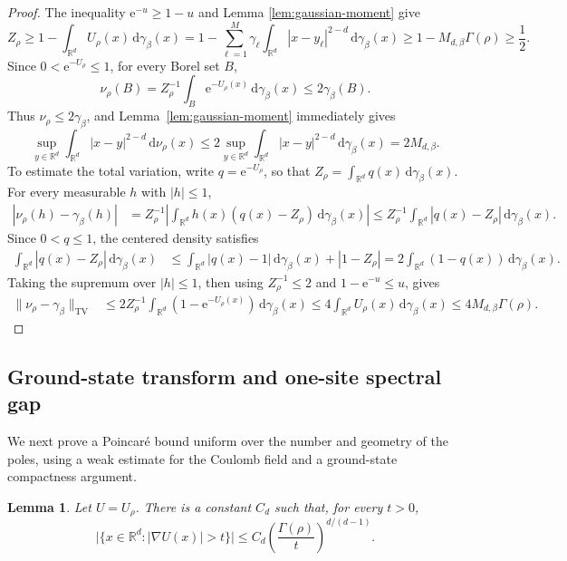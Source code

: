 \documentclass[12pt,reqno,letterpaper]{amsart}
\newtheorem{lemma}[theorem]{Lemma}
\theoremstyle{definition}
\theoremstyle{remark}
\numberwithin{equation}{section}
\newcommand{\R}{\mathbb R}
\newcommand{\dd}{\,\mathrm d}
\newcommand{\ee}{\mathrm e}
\newcommand{\be}{\beta}
\newcommand{\TV}{\mathrm{TV}}
\begin{document}
\begin{proof}
The inequality \(\ee^{-u}\ge1-u\) and Lemma
\ref{lem:gaussian-moment} give
\begin{equation*}
 Z_{\rho}
 \ge1-\int_{\R^d}U_{\rho}(x)\dd\gamma_\be(x)
 =1-\sum_{\ell=1}^M\gamma_\ell
   \int_{\R^d}|x-y_\ell|^{2-d}\dd\gamma_\be(x)
 \ge1-M_{d,\be}\Gamma(\rho)\ge\frac{1}{2}.
\end{equation*}
Since \(0<\ee^{-U_\rho}\le1\), for every Borel set \(B\),
\[
 \nu_\rho(B)
 =Z_\rho^{-1}\int_B\ee^{-U_\rho(x)}\dd\gamma_\be(x)
 \le2\gamma_\be(B).
\]
Thus \(\nu_\rho\le2\gamma_\be\), and Lemma~\ref{lem:gaussian-moment}
immediately gives
\[
 \sup_{y\in\R^d}\int_{\R^d}|x-y|^{2-d}\dd\nu_\rho(x)
 \le2\sup_{y\in\R^d}\int_{\R^d}|x-y|^{2-d}\dd\gamma_\be(x)
 =2M_{d,\be}.
\]
To estimate the total variation, write \(q=\ee^{-U_{\rho}}\), so that
\(Z_{\rho}=\int_{\R^d}q(x)\dd\gamma_\be(x)\).  For every measurable \(h\) with
\(|h|\le1\),
\begin{align*}
 |\nu_{\rho}(h)-\gamma_\be(h)|
 &=Z_{\rho}^{-1}\left|\int_{\R^d}h(x)(q(x)-Z_{\rho})
   \dd\gamma_\be(x)\right|\le Z_{\rho}^{-1}\int_{\R^d}|q(x)-Z_{\rho}|\dd\gamma_\be(x).
\end{align*}
Since \(0<q\le1\), the centered density satisfies
\begin{align*}
 \int_{\R^d}|q(x)-Z_{\rho}|\dd\gamma_\be(x)
 &\le\int_{\R^d}|q(x)-1|\dd\gamma_\be(x)+|1-Z_{\rho}|=2\int_{\R^d}(1-q(x))\dd\gamma_\be(x).
\end{align*}
Taking the supremum over \(|h|\le1\), then using
\(Z_{\rho}^{-1}\le2\) and \(1-\ee^{-u}\le u\), gives
\begin{align*}
 \|\nu_{\rho}-\gamma_\be\|_{\TV}
 &\le2Z_{\rho}^{-1}
   \int_{\R^d}(1-\ee^{-U_{\rho}(x)})\dd\gamma_\be(x)\le4\int_{\R^d}U_{\rho}(x)\dd\gamma_\be(x)\le4M_{d,\be}\Gamma(\rho).
\end{align*}
\end{proof}

\subsection{Ground-state transform and one-site spectral gap}

We next prove a Poincar\'e bound uniform over the number and geometry of
the poles, using a weak estimate for the Coulomb field and a ground-state
compactness argument.

\begin{lemma}\label{lem:weak-field}
Let \(U=U_{\rho}\).  There is a constant \(C_d\)
such that, for every \(t>0\),
\begin{equation}\label{eq:weak-field}
 \big|\{x\in\R^d:|\nabla U(x)|>t\}\big|
 \le C_d\left(\frac{\Gamma(\rho)}{t}\right)^{d/(d-1)}.
\end{equation}
\end{lemma}
\end{document}
